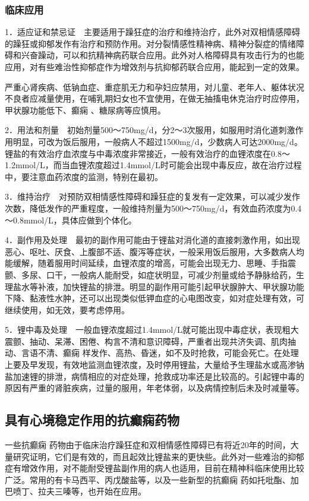 \subsubsection{临床应用}

1．适应证和禁忌证　主要适用于躁狂症的治疗和维持治疗，此外对双相情感障碍的躁狂或抑郁发作有治疗和预防作用。对分裂情感性精神病、精神分裂症的情绪障碍和兴奋躁动，可以和抗精神病药联合应用。此外对人格障碍具有攻击行为的也能应用，对有些难治性抑郁症作为增效剂与抗抑郁药联合应用，能起到一定的效果。

严重心肾疾病、低钠血症、重症肌无力和孕妇应禁用，对儿童、老年人、躯体状况不良者应减量使用，在哺乳期妇女也不宜使用，在做无抽搐电休克治疗时应停用，甲状腺功能低下、癫痫
、糖尿病等应慎用。

2．用法和剂量　初始剂量500～750mg/d，分2～3次服用，如服用时消化道刺激作用明显，可改为饭后服用，一般病人不超过1500mg/d，少数病人可达2000mg/d。锂盐的有效治疗血浓度与中毒浓度非常接近，一般有效治疗的血锂浓度在0.8～1.2mmol/L，而当血锂浓度超过1.4mmol/L时可能会出现中毒反应，故在治疗过程中，要注意血药浓度的监测，特别在最初。

3．维持治疗　对预防双相情感性障碍和躁狂症的复发有一定效果，可以减少发作次数，降低发作的严重程度，一般维持剂量为500～750mg/d，有效血药浓度为0.4～0.8mmol/L，具体应做到个体化。

4．副作用及处理　最初的副作用可能由于锂盐对消化道的直接刺激作用，如出现恶心、呕吐、厌食、上腹部不适、腹泻等症状，一般采用饭后服用，大多数病人均能缓解，随着服用时间延续，血锂浓度的增高，可能会出现无力、思睡、手指震颤、多尿、口干，一般病人能耐受，如症状明显，可减少剂量或给予静脉给药，生理盐水等补液，加快锂盐的排泄。明显的副作用可能引起甲状腺肿大、甲状腺功能下降、黏液性水肿，还可以出现类似低钾血症的心电图改变，如对症处理有效，可继续使用，如无效，要考虑停用。

5．锂中毒及处理　一般血锂浓度超过1.4mmol/L就可能出现中毒症状，表现粗大震颤、抽动、呆滞、困倦、构言不清和意识障碍，严重者出现共济失调、肌肉抽动、言语不清、癫痫
样发作、高热、昏迷，如不及时抢救，可能会死亡。在处理上要及早发现，有效地监测血锂浓度，及时停用锂盐，大量给予生理盐水或高渗钠盐加速锂的排泄，病情相应的对症处理，抢救成功率还是比较高的。引起锂中毒的原因有严重的肾脏疾病，过量的服用，年老体弱，以及病情控制后未及时减量等。

\subsection{具有心境稳定作用的抗癫痫药物}

一些抗癫痫
药物由于临床治疗躁狂症和双相情感性障碍已有将近20年的时间，大量研究证明，它们是有效的，而且起效比锂盐来的更快些。此外对一些难治的抑郁症有增效作用，对不能耐受锂盐副作用的病人也适用，目前在精神科临床使用比较广泛。常用的有卡马西平、丙戊酸盐等，以及一些新型的抗癫痫
药如托吡酯、加巴喷丁、拉夫三嗪等，也开始在应用。

